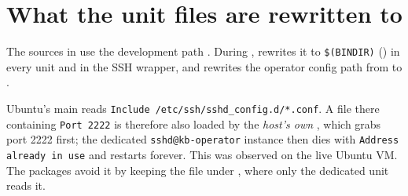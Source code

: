 \section{What the unit files are rewritten to}
The sources in  use the development path . During
,  rewrites it to \texttt{\$(BINDIR)} () in every unit and in the SSH wrapper, and
rewrites the operator  config path from  to
.

\begin{kbnote}
Ubuntu's main  reads \texttt{Include /etc/ssh/sshd\_config.d/*.conf}. A file there containing
\texttt{Port 2222} is therefore also loaded by the \emph{host's own} , which grabs port 2222 first;
the dedicated \texttt{sshd@kb-operator} instance then dies with \texttt{Address already in use} and restarts
forever. This was observed on the live Ubuntu VM. The packages avoid it by keeping the file under
, where only the dedicated unit reads it.
\end{kbnote}

